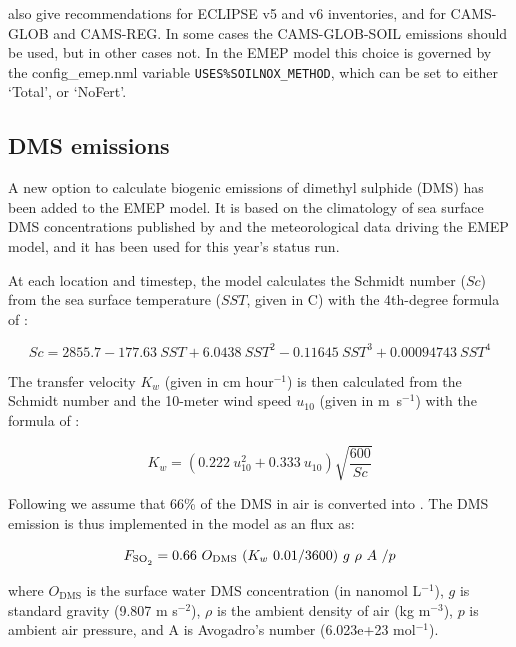 \citet{SimpsonDarras:2021} also give recommendations for
ECLIPSE v5 and v6 inventories, and for CAMS-GLOB and CAMS-REG. In
some cases the CAMS-GLOB-SOIL \Nfert emissions should be used, but
in other cases not. In the EMEP model this choice is governed
by the config\_emep.nml variable \verb|USES%SOILNOX_METHOD|, which can
be set to either `Total', or `NoFert'. 



\subsection{DMS emissions}
\label{ssec:DMS}


A new option to calculate biogenic emissions of dimethyl sulphide (DMS) has been added to the EMEP model. It is based on the climatology of sea surface DMS concentrations published by \citet{Lana2011} and the meteorological data driving the EMEP model, and it has been used for this year's status run. 

At each location and timestep, the model calculates the Schmidt number ($Sc$) from the sea surface temperature ($SST$, given in \textdegree C) with the 4th-degree formula of \citet{Wanninkhof2014}:


\begin{equation}
Sc=2855.7 -177.63\  SST + 6.0438\  SST^2 - 0.11645\  SST^3 + 0.00094743\ SST^4
\end{equation}


The transfer velocity $K_{w}$ (given in cm hour$^{-1}$) is then calculated  from the Schmidt number and the 10-meter wind speed $u_{10}$ (given in m~s$^{-1}$) with the formula of \citet{Nightingale2000}:

\begin{equation}
K_w=(0.222\  u_{10}^2 +0.333\ u_{10}) \sqrt{\frac{600}{Sc}}
\end{equation}

Following \citet{Leonor:DMS2} we assume that 66\% of the DMS in air is converted into . The DMS emission is thus implemented in the model as an  flux as:

\begin{equation}
F_{\ce{SO2}} = 0.66\ O_{\textrm{DMS}}\ (K_{w}\ 0.01/3600)\ g\ \rho\ A\ / p  
\end{equation}

where $O_{\textrm{DMS}}$ is the surface water DMS concentration (in nanomol L$^{-1}$),
$g$ is standard gravity (9.807 m s$^{-2}$),
$\rho$ is the ambient density of air (kg m$^{-3}$),
$p$ is ambient air pressure,
and A is Avogadro's number (6.023e+23 mol$^{-1}$).

